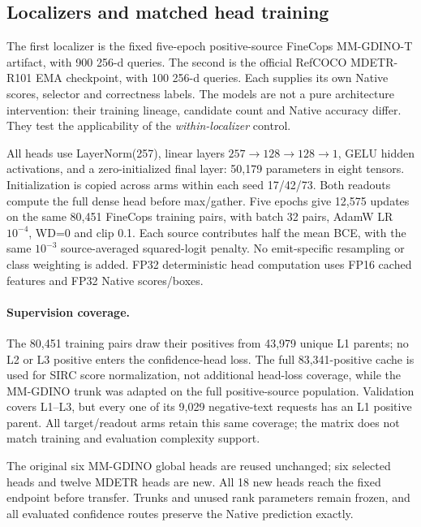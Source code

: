 \documentclass[10pt,twocolumn,letterpaper]{article}
\begin{document}
\subsection{Localizers and matched head training}
The first localizer is the fixed five-epoch positive-source FineCops
MM-GDINO-T artifact, with 900 256-d queries.
The second is the official RefCOCO MDETR-R101 EMA checkpoint, with
100 256-d queries. Each supplies its own Native scores, selector and
correctness labels. The models are not a pure architecture intervention:
their training lineage, candidate count and Native accuracy differ.
They test the applicability of the \emph{within-localizer} control.

All heads use LayerNorm(257), linear layers
$257\rightarrow128\rightarrow128\rightarrow1$, GELU hidden activations,
and a zero-initialized final layer: 50,179 parameters in eight tensors.
Initialization is copied across arms within each seed 17/42/73.
Both readouts compute the full dense head before max/gather.
Five epochs give 12,575 updates on the same 80,451 FineCops training
pairs, with batch 32 pairs, AdamW LR $10^{-4}$, WD=0 and clip 0.1.
Each source contributes half the mean BCE, with the same $10^{-3}$
source-averaged squared-logit penalty. No emit-specific resampling or
class weighting is added. FP32 deterministic head computation uses
FP16 cached features and FP32 Native scores/boxes.

\paragraph{Supervision coverage.}
The 80,451 training pairs draw their positives from 43,979 unique L1
parents; no L2 or L3 positive enters the confidence-head loss.
The full 83,341-positive cache is used for SIRC score normalization,
not additional head-loss coverage, while the MM-GDINO trunk was
adapted on the full positive-source population.
Validation covers L1--L3, but every one of its 9,029 negative-text
requests has an L1 positive parent. All target/readout arms retain
this same coverage; the matrix does not match training and evaluation
complexity support.

The original six MM-GDINO global heads are reused unchanged; six
selected heads and twelve MDETR heads are new. All 18 new heads reach
the fixed endpoint before transfer. Trunks and unused rank parameters
remain frozen, and all evaluated confidence routes preserve the Native
prediction exactly.
\end{document}

